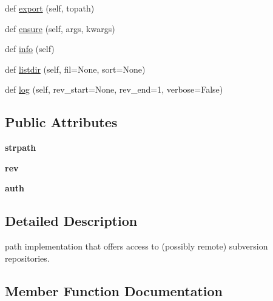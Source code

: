 \begin{DoxyCompactItemize}
\item 
def \hyperlink{classpy_1_1__path_1_1svnurl_1_1_svn_command_path_a15e070016e51ace4118b18bc7ee5e942}{export} (self, topath)
\item 
def \hyperlink{classpy_1_1__path_1_1svnurl_1_1_svn_command_path_a8a262945224f11008f10757907fe3e40}{ensure} (self, args, kwargs)
\item 
def \hyperlink{classpy_1_1__path_1_1svnurl_1_1_svn_command_path_aaf4b361937c91ea7803582881782aa52}{info} (self)
\item 
def \hyperlink{classpy_1_1__path_1_1svnurl_1_1_svn_command_path_a3b00a0a86e5fa7d7dea985c810673ff7}{listdir} (self, fil=None, sort=None)
\item 
def \hyperlink{classpy_1_1__path_1_1svnurl_1_1_svn_command_path_a0552e3647238a74f351ea7d7f04f06e5}{log} (self, rev\+\_\+start=None, rev\+\_\+end=1, verbose=False)
\end{DoxyCompactItemize}
\subsection*{Public Attributes}
\begin{DoxyCompactItemize}
\item 
\mbox{\label{classpy_1_1__path_1_1svnurl_1_1_svn_command_path_a9c96c63a94c79026ae43d244cf009316}} 
{\bfseries strpath}
\item 
\mbox{\label{classpy_1_1__path_1_1svnurl_1_1_svn_command_path_a2fa6691a550192269b60ff7908664439}} 
{\bfseries rev}
\item 
\mbox{\label{classpy_1_1__path_1_1svnurl_1_1_svn_command_path_ace21eef58371565b17851ebf274aafa8}} 
{\bfseries auth}
\end{DoxyCompactItemize}


\subsection{Detailed Description}
\begin{DoxyVerb}path implementation that offers access to (possibly remote) subversion
repositories. \end{DoxyVerb}
 

\subsection{Member Function Documentation}
\mbox{\label{classpy_1_1__path_1_1svnurl_1_1_svn_command_path_aa24a5d520b9506e99516a6f40b4f8c20}} 
